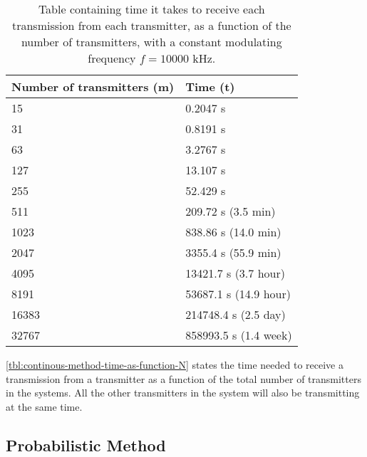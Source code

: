 \begin{table}[t]
	\centering
	\begin{tabular}{  | l | l | }

	\hline
	Number of transmitters (m)	& Time (t)					\\ \hline


	15							& 0.2047 s					\\ \hline
	31							& 0.8191 s					\\ \hline
	63							& 3.2767 s					\\ \hline
	127							& 13.107 s					\\ \hline
	255							& 52.429 s					\\ \hline
	511							& 209.72 s (3.5 min)		\\ \hline
	1023						& 838.86 s (14.0 min)		\\ \hline
	2047						& 3355.4 s (55.9 min)		\\ \hline
	4095						& 13421.7 s (3.7 hour)		\\ \hline
	8191						& 53687.1 s (14.9 hour)		\\ \hline
	16383						& 214748.4 s (2.5 day)		\\ \hline
	32767						& 858993.5 s (1.4 week)		\\ \hline



\end{tabular}
	\caption{Table containing time it takes to receive each transmission from each transmitter, as a function of the number of transmitters, with a constant modulating frequency $f = 10000$ kHz.}
	\label{tbl:continous-method-time-as-function-N}
\end{table}

\autoref{tbl:continous-method-time-as-function-N} states the time needed to receive a transmission from a transmitter as a function of the total number of transmitters in the systems. 
All the other transmitters in the system will also be transmitting at the same time.





\subsection{Probabilistic Method}



